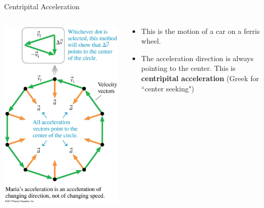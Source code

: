 \documentclass{beamer}
\begin{document}
\begin{frame}{Centripital Acceleration}
\begin{columns}
\begin{column}{0.4\textwidth}
\begin{center}
   \includegraphics[width=\textwidth]{../figures/04_27_Figure.jpg}
\end{center}
\end{column}
\begin{column}{0.6\textwidth}
\begin{itemize}
   \item This is the motion of a car on a ferris wheel.
   \item The acceleration direction is always pointing to the center. This is {\bf centripital acceleration} (Greek for ``center seeking")

\end{itemize}
\end{column}
\end{columns}
\end{frame}
\end{document}
